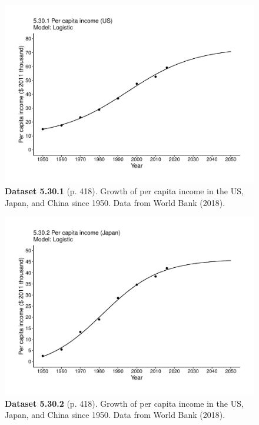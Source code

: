 \documentclass[aps,rmp,preprint,superscriptaddress,10pt,onecolumn]{article}
\begin{document}
\clearpage
\begin{figure}[h]
\includegraphics[width=\textwidth]{output/figs-ggplot/5.30.1.pdf}
\caption*{\textbf{Dataset 5.30.1} (p. 418). Growth of per capita income in the US, Japan, and China since 1950. Data from World Bank (2018).}
\end{figure}
	
\clearpage
\begin{figure}[h]
\includegraphics[width=\textwidth]{output/figs-ggplot/5.30.2.pdf}
\caption*{\textbf{Dataset 5.30.2} (p. 418). Growth of per capita income in the US, Japan, and China since 1950. Data from World Bank (2018).}
\end{figure}
	
\end{document}
